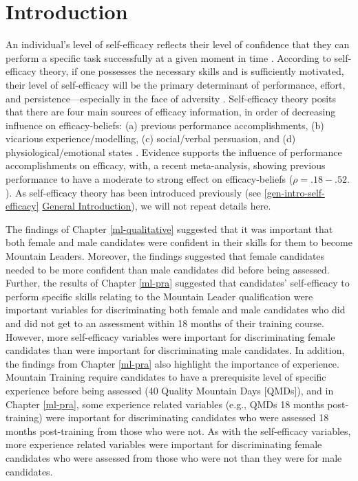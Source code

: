\documentclass[
  12pt,
  a4paper,
]{book}
\begin{document}
\hypertarget{chapter-4-introduction}{%
\section{Introduction}\label{chapter-4-introduction}}

An individual's level of self-efficacy reflects their level of confidence that they can perform a specific task successfully at a given moment in time \citep{Bandura1977}. According to self-efficacy theory, if one possesses the necessary skills and is sufficiently motivated, their level of self-efficacy will be the primary determinant of performance, effort, and persistence---especially in the face of adversity \citep{Bandura1977, Bandura1982, Bandura1997}. Self-efficacy theory posits that there are four main sources of efficacy information, in order of decreasing influence on efficacy-beliefs: (a) previous performance accomplishments, (b) vicarious experience/modelling, (c) social/verbal persuasion, and (d) physiological/emotional states \citep{Bandura1982}. Evidence supports the influence of performance accomplishments on efficacy, with, a recent meta-analysis, \citet{Sitzmann2013} showing previous performance to have a moderate to strong effect on efficacy-beliefs (\(\rho = .18-.52.\)). As self-efficacy theory has been introduced previously (see \ref{gen-intro-self-efficacy} \protect\hyperlink{gen-intro-self-efficacy}{General Introduction}), we will not repeat details here.

The findings of Chapter \ref{ml-qualitative} suggested that it was important that both female and male candidates were confident in their skills for them to become Mountain Leaders. Moreover, the findings suggested that female candidates needed to be more confident than male candidates did before being assessed. Further, the results of Chapter \ref{ml-pra} suggested that candidates' self-efficacy to perform specific skills relating to the Mountain Leader qualification were important variables for discriminating both female and male candidates who did and did not get to an assessment within 18 months of their training course. However, more self-efficacy variables were important for discriminating female candidates than were important for discriminating male candidates. In addition, the findings from Chapter \ref{ml-pra} also highlight the importance of experience. Mountain Training require candidates to have a prerequisite level of specific experience before being assessed (40 Quality Mountain Days {[}QMDs{]}), and in Chapter \ref{ml-pra}, some experience related variables (e.g., QMDs 18 months post-training) were important for discriminating candidates who were assessed 18 months post-training from those who were not. As with the self-efficacy variables, more experience related variables were important for discriminating female candidates who were assessed from those who were not than they were for male candidates.
\end{document}

